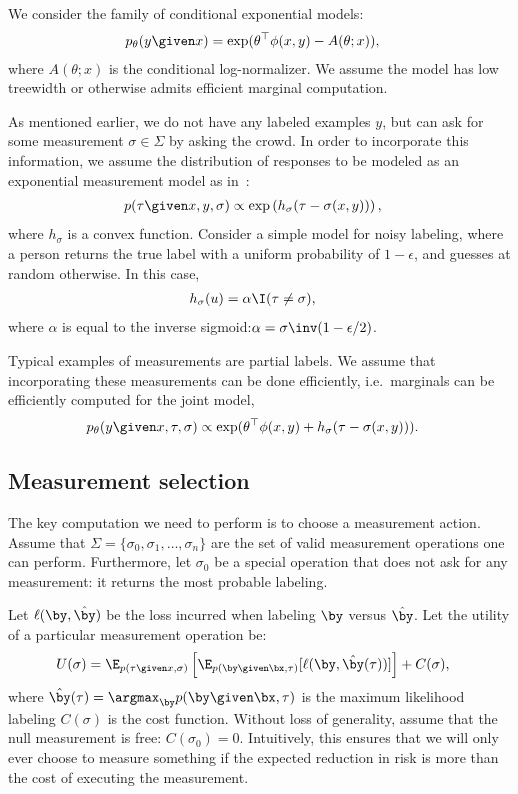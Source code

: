 We consider the family of conditional exponential models:
\begin{align*}
  p_\theta(y \given x) 
  &= \exp( \theta^\top \phi(x, y) - A(\theta; x)),
\end{align*}
where $A(\theta; x)$ is the conditional log-normalizer.
We assume the model has low treewidth or otherwise admits efficient marginal computation.

As mentioned earlier, we do not have any labeled examples $y$, but can ask for some measurement $\sigma \in \Sigma$ by asking the crowd. 
In order to incorporate this information, we assume the distribution of responses to be modeled as an exponential measurement model as in~\cite{liang09measurements}:
\begin{align*}
  p(\tau \given x, y, \sigma) 
  &\propto \exp \left( h_\sigma(\tau - \sigma(x,y)) \right),
\end{align*}
where $h_\sigma$ is a convex function.
Consider a simple model for noisy labeling, where a person returns the true label with a uniform probability of $1- \epsilon$, and guesses at random otherwise. In this case, 
\begin{align*}
  h_\sigma(u) &= \alpha \I(\tau \neq \sigma),
\end{align*}
where $\alpha$ is equal to the inverse sigmoid:$\alpha = \sigma\inv(1 - \epsilon/2)$.

Typical examples of measurements are partial labels.
We assume that incorporating these measurements can be done efficiently, i.e.\ marginals can be efficiently computed for the joint model,
\begin{align*}
  p_\theta(y \given x, \tau, \sigma) 
  &\propto \exp(\theta^\top \phi(x, y) + h_\sigma(\tau - \sigma(x,y))).
\end{align*}

\subsection{Measurement selection}

The key computation we need to perform is to choose a measurement action.
Assume that $\Sigma = \{\sigma_0, \sigma_1, \dots, \sigma_n\}$ are the set of valid measurement operations one can perform. 
Furthermore, let $\sigma_0$ be a special operation that does not ask for any measurement: it returns the most probable  labeling.

Let $\ell(\by, \byt)$ be the loss incurred when labeling $\by$ versus $\byt$.
Let the utility of a particular measurement operation be:
\begin{align*}
U(\sigma)
&= \E_{p(\tau \given x, \sigma)} \left[
      \E_{p(\by \given \bx, \tau)}[\ell(\by, \byt(\tau))] \right] + C(\sigma),
\end{align*}
where $\byt(\tau) = \argmax_{\by} p(\by \given \bx, \tau)$ is the maximum likelihood labeling $C(\sigma)$ is the cost function.
Without loss of generality, assume that the null measurement is free: $C(\sigma_0) = 0$.
Intuitively, this ensures that we will only ever choose to measure something if the expected reduction in risk is more than the cost of executing the measurement.


